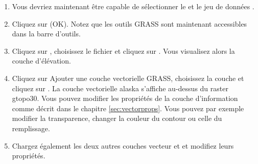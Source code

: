 \begin{enumerate}
  \item Vous devriez maintenant être capable de sélectionner le  et le jeu de données . 
  \item Cliquez sur \button(OK). Notez que les outils GRASS sont maintenant accessibles dans la barre d'outils.
  \item Cliquez sur , choisissez le fichier  et cliquez sur . Vous visualisez alors la couche d'élévation.
  \item Cliquez sur  {Ajouter une couche vectorielle GRASS}, choisissez la couche  et cliquez sur . La couche vectorielle alaska s'affiche au-dessus du raster gtopo30. Vous pouvez modifier les propriétés de la couche d'information comme décrit dans le chapitre \ref{sec:vectorprops}. Vous pouvez par exemple modifier la transparence, changer la couleur du contour ou celle du remplissage.
  \item Chargez également les deux autres couches vecteur  et  et modifiez leurs propriétés.
\end{enumerate}


